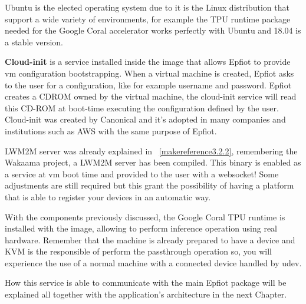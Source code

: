 Ubuntu is the elected operating system due to it is the Linux distribution that support a wide variety of environments, for example the TPU runtime package needed for the Google Coral accelerator works perfectly with Ubuntu and 18.04 is a stable version.

\textbf{Cloud-init} is a service installed inside the image that allows Epfiot to provide vm configuration bootstrapping. When a virtual machine is created, Epfiot asks to the user for a configuration, like for example username and password. Epfiot creates a CDROM owned by the virtual machine, the cloud-init service will read this CD-ROM at boot-time executing the configuration defined by the user. Cloud-init was created by Canonical and it's adopted in many companies and institutions such as AWS with the same purpose of Epfiot.

LWM2M server was already explained in ~\ref{makereference3.2.2}, remembering the Wakaama project, a LWM2M server has been compiled. This binary is enabled as a service at vm boot time and provided to the user with a websocket! Some adjustments are still required but this grant the possibility of having a platform that is able to register your devices in an automatic way.

With the components previously discussed, the Google Coral TPU runtime is installed with the image, allowing to perform inference operation using real hardware. Remember that the machine is already prepared to have a device and KVM is the responsible of perform the passthrough operation so, you will experience the use of a normal machine with a connected device handled by udev.

How this service is able to communicate with the main Epfiot package will be explained all together with the application's architecture in the next Chapter. 
